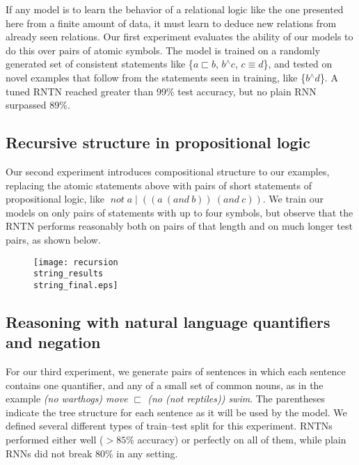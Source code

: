 \documentclass{article} %
\newcommand{\nateq}{\equiv}
\newcommand{\natneg}{\mathbin{^{\wedge}}}
\newcommand{\natfor}{\sqsubset}
\newcommand{\natalt}{\mathbin{|}}
\newcommand{\plneg}{\mathop{\textit{not}}}
\newcommand{\pland}{\mathbin{\textit{and}}}
\begin{document}
If any model is to learn the behavior of a relational logic like the one presented here from a finite amount of data, it must learn to deduce new relations from already seen relations. Our first experiment evaluates the ability of our models to do this over pairs of atomic symbols. The model is trained on a randomly generated set of consistent statements like \{$a \natfor b$, $b \natneg c$, $c \nateq d$\}, and tested on novel examples that follow from the statements seen in training, like \{$b \natneg d$\}. A tuned RNTN reached greater than 99\% test accuracy, but no plain RNN surpassed 89\%.

\subsection*{Recursive structure in propositional logic}\label{sec:recursion}

Our second experiment introduces compositional structure to our examples, replacing the atomic statements above with pairs of short statements of propositional logic, like $\plneg a\natalt((a~(\pland~ b))~(\pland~c))$. We train our models on only pairs of statements with up to four symbols, but observe that the RNTN performs reasonably both on pairs of that length and on much longer test pairs, as shown below. 

\begin{figure}[h]
  \centering
  \texttt{[image: recursion\\string\_results\\string\_final.eps]}
  \label{prop-results}
\end{figure}

\subsection*{Reasoning with natural language quantifiers and negation}\label{sec:quantifiers}

For our third experiment, we generate pairs of sentences in which each sentence contains one quantifier, and any of a small set of common nouns, as in the example \textit{(no warthogs) move $\natfor$ (no (not reptiles)) swim}. The parentheses indicate the tree structure for each sentence as it will be used by the model. We defined several different types of train--test split for this experiment. RNTNs performed either well ($>85\%$ accuracy) or perfectly on all of them, while plain RNNs did not break 80\% in any setting.




\small %
 
\end{document}
